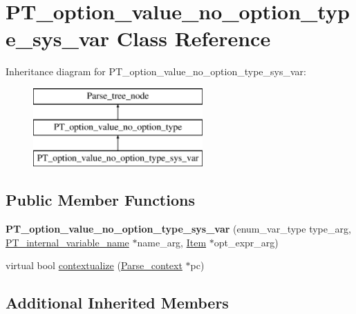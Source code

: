 \hypertarget{classPT__option__value__no__option__type__sys__var}{}\section{P\+T\+\_\+option\+\_\+value\+\_\+no\+\_\+option\+\_\+type\+\_\+sys\+\_\+var Class Reference}
\label{classPT__option__value__no__option__type__sys__var}
Inheritance diagram for P\+T\+\_\+option\+\_\+value\+\_\+no\+\_\+option\+\_\+type\+\_\+sys\+\_\+var\+:\begin{figure}[H]
\begin{center}
\leavevmode
\includegraphics[height=3.000000cm]{classPT__option__value__no__option__type__sys__var}
\end{center}
\end{figure}
\subsection*{Public Member Functions}
\begin{DoxyCompactItemize}
\item 
\mbox{\label{classPT__option__value__no__option__type__sys__var_a7b2f9dc2f228b24d1cdafceeed7425ff}} 
{\bfseries P\+T\+\_\+option\+\_\+value\+\_\+no\+\_\+option\+\_\+type\+\_\+sys\+\_\+var} (enum\+\_\+var\+\_\+type type\+\_\+arg, \mbox{\hyperlink{classPT__internal__variable__name}{P\+T\+\_\+internal\+\_\+variable\+\_\+name}} $\ast$name\+\_\+arg, \mbox{\hyperlink{classItem}{Item}} $\ast$opt\+\_\+expr\+\_\+arg)
\item 
virtual bool \mbox{\hyperlink{classPT__option__value__no__option__type__sys__var_abd287cc5111f786a62032da4ff2b518f}{contextualize}} (\mbox{\hyperlink{structParse__context}{Parse\+\_\+context}} $\ast$pc)
\end{DoxyCompactItemize}
\subsection*{Additional Inherited Members}


